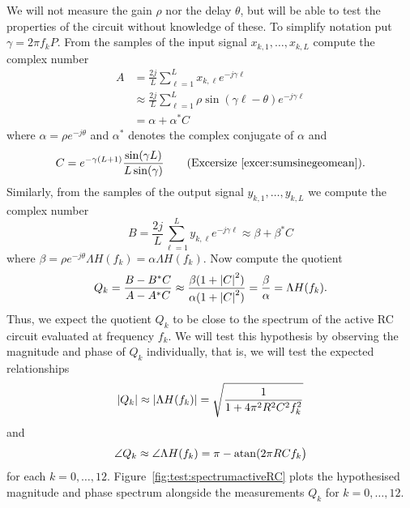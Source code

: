 \begin{test}
We will not measure the gain $\rho$ nor the delay $\theta$, but will be able to test the properties of the circuit without knowledge of these.  To simplify notation put $\gamma = 2\pi f_k P$.  From the samples of the input signal $x_{k,1},\dots,x_{k,L}$ compute the complex number
\begin{align*}
A &= \frac{2j}{L}\sum_{\ell=1}^{L} x_{k,\ell} e^{-j \gamma \ell} \\
&\approx \frac{2j}{L}\sum_{\ell=1}^{L} \rho \sin( \gamma \ell - \theta)  e^{-j \gamma \ell} \\
&= \alpha + \alpha^* C
\end{align*}
where $\alpha = \rho e^{- j \theta}$ and $\alpha^*$ denotes the complex conjugate of $\alpha$ and
\[
C = e^{-\gamma (L+1)} \frac{  \sin( \gamma L)  }{L \sin(\gamma)  } \qquad \text{(Excersize~\ref{excer:sumsinegeomean})} .
\]
Similarly, from the samples of the output signal $y_{k,1},\dots,y_{k,L}$ we compute the complex number
\[
B = \frac{2j}{L}\sum_{\ell=1}^{L} y_{k,\ell} e^{-j \gamma\ell} \approx \beta + \beta^*C
\]
where $\beta = \rho  e^{-j\theta} \Lambda H(f_k) = \alpha \Lambda H(f_k)$.  Now compute the quotient
\[
Q_k = \frac{B - B^* C}{A - A^* C} \approx \frac{\beta (1 + \left\vert C \right\vert^2)}{\alpha (1 + \left\vert C \right\vert^2)} = \frac{\beta}{\alpha} = \Lambda H(f_k).
\]
Thus, we expect the quotient $Q_k$ to be close to the spectrum of the active RC circuit evaluated at frequency $f_k$.  We will test this hypothesis by observing the magnitude and phase of $Q_k$ individually, that is, we will test the expected relationships
\[
\left\vert Q_k \right\vert \approx \left\vert \Lambda H(f_k) \right\vert = \sqrt{\frac{1}{1 + 4\pi^2 R^2 C^2 f_k^2}}
\]
and
\[
\angle Q_k \approx \angle \Lambda H(f_k) = \pi - \operatorname{atan}( 2\pi R C f_k \big)
\]
for each $k = 0,\dots,12$.  Figure~\ref{fig:test:spectrumactiveRC} plots the hypothesised magnitude and phase spectrum alongside the measurements $Q_k$ for $k = 0, \dots, 12$.

\end{test}

